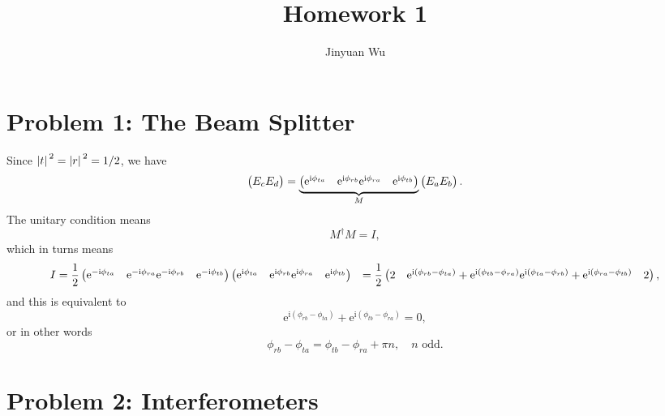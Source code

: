 \documentclass[hyperref, a4paper]{article}
\title{Homework 1}
\author{Jinyuan Wu}
\newcommand*{\ii}{\mathrm{i}}
\newcommand*{\ee}{\mathrm{e}}
\def\\{}%
\begin{document}
\maketitle 

\section{Problem 1: The Beam Splitter}

Since $\abs*{t}^2 = \abs*{r}^2 = 1/2$,
we have 
\begin{equation}
    \pmqty{E_c \\ E_d} = 
    \underbrace{
        \pmqty{
        \ee^{\ii \phi_{ta}} & \ee^{\ii \phi_{rb}} \\
        \ee^{\ii \phi_{ra}} & \ee^{\ii \phi_{tb}} 
        }
    }_M \pmqty{E_{a} \\ E_b}.
\end{equation}
The unitary condition means 
\begin{equation}
    M^\dagger M = I,
\end{equation}
which in turns means 
\[
    \begin{aligned}
        I &= \frac{1}{2} 
        \pmqty{
            \ee^{- \ii \phi_{ta}} & \ee^{-\ii \phi_{ra}} \\
            \ee^{- \ii \phi_{rb}} & \ee^{-\ii \phi_{tb}} 
        } 
        \pmqty{
            \ee^{\ii \phi_{ta}} & \ee^{\ii \phi_{rb}} \\
            \ee^{\ii \phi_{ra}} & \ee^{\ii \phi_{tb}} 
        } \\ 
        &= \frac{1}{2} \pmqty{
            2 & \ee^{\ii (\phi_{rb} - \phi_{ta})} + \ee^{\ii (\phi_{tb} - \phi_{ra})} \\
            \ee^{\ii (\phi_{ta} - \phi_{rb})} + \ee^{\ii (\phi_{ra} - \phi_{tb})} & 2
        },
    \end{aligned}
\]
and this is equivalent to 
\[
    \ee^{\ii (\phi_{rb} - \phi_{ta})} + \ee^{\ii (\phi_{tb} - \phi_{ra})} = 0,
\]
or in other words 
\begin{equation}
    \phi_{rb} - \phi_{ta} = \phi_{tb} - \phi_{ra} + \pi n, \quad \text{$n$ odd}.
\end{equation}

\section{Problem 2: Interferometers}
\end{document}

